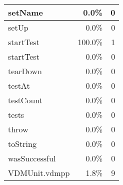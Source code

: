 \documentclass[a4paper]{article}
\begin{document}
\begin{longtable}{|l|r|r|}
\hline
setName & 0.0\% & 0 \\
\hline
setUp & 0.0\% & 0 \\
\hline
startTest & 100.0\% & 1 \\
\hline
startTest & 0.0\% & 0 \\
\hline
tearDown & 0.0\% & 0 \\
\hline
testAt & 0.0\% & 0 \\
\hline
testCount & 0.0\% & 0 \\
\hline
tests & 0.0\% & 0 \\
\hline
throw & 0.0\% & 0 \\
\hline
toString & 0.0\% & 0 \\
\hline
wasSuccessful & 0.0\% & 0 \\
\hline
\hline
VDMUnit.vdmpp & 1.8\% & 9 \\
\hline
\end{longtable}
\end{document}
